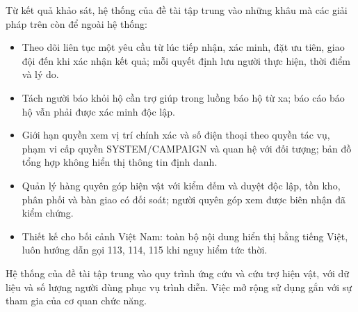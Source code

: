 \documentclass[12pt,a4paper,oneside]{report}
\begin{document}
Từ kết quả khảo sát, hệ thống của đề tài tập trung vào những khâu mà các giải pháp trên còn để ngoài hệ thống:
\begin{itemize}
  \item Theo dõi liên tục một yêu cầu từ lúc tiếp nhận, xác minh, đặt ưu tiên, giao đội đến khi xác nhận kết quả; mỗi quyết định lưu người thực hiện, thời điểm và lý do.
  \item Tách người báo khỏi hộ cần trợ giúp trong luồng báo hộ từ xa; báo cáo báo hộ vẫn phải được xác minh độc lập.
  \item Giới hạn quyền xem vị trí chính xác và số điện thoại theo quyền tác vụ, phạm vi cấp quyền SYSTEM/CAMPAIGN và quan hệ với đối tượng; bản đồ tổng hợp không hiển thị thông tin định danh.
  \item Quản lý hàng quyên góp hiện vật với kiểm đếm và duyệt độc lập, tồn kho, phân phối và bàn giao có đối soát; người quyên góp xem được biên nhận đã kiểm chứng.
  \item Thiết kế cho bối cảnh Việt Nam: toàn bộ nội dung hiển thị bằng tiếng Việt, luôn hướng dẫn gọi 113, 114, 115 khi nguy hiểm tức thời.
\end{itemize}
Hệ thống của đề tài tập trung vào quy trình ứng cứu và cứu trợ hiện vật, với dữ liệu và số lượng người dùng phục vụ trình diễn. Việc mở rộng sử dụng gắn với sự tham gia của cơ quan chức năng.
\end{document}
